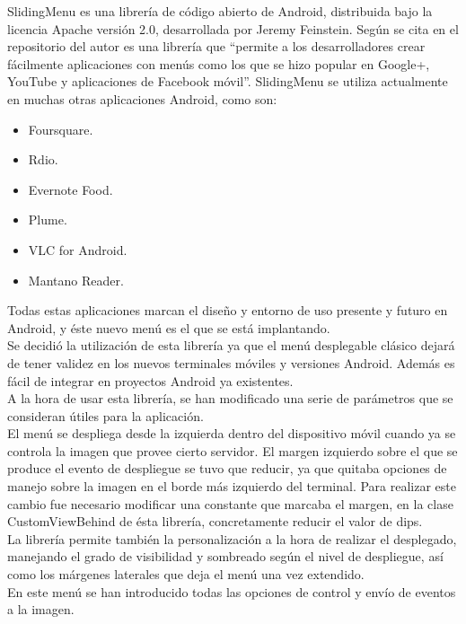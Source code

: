 SlidingMenu\cite{slide:slide} es una librería de código abierto de Android, distribuida bajo la licencia Apache versión 2.0, desarrollada por Jeremy Feinstein. Según se cita en el repositorio del autor es una librería que “permite a los desarrolladores crear fácilmente aplicaciones con menús como los que se hizo popular en Google+, YouTube y aplicaciones de Facebook móvil”.\cite{slide:slide}
SlidingMenu se utiliza actualmente en muchas otras aplicaciones Android, como son:
\begin{itemize}
\item Foursquare.
\item Rdio.
\item Evernote Food.
\item Plume.
\item VLC for Android.
\item Mantano Reader.
\end{itemize}

Todas estas aplicaciones marcan el diseño y entorno de uso presente y futuro en Android, y éste nuevo menú es el que se está implantando.\\

Se decidió la utilización de esta librería ya que el menú desplegable clásico dejará de tener validez en los nuevos terminales móviles y versiones Android. Además es fácil de integrar en proyectos Android ya existentes.\\

A la hora de usar esta librería, se han modificado una serie de parámetros que se consideran útiles para la aplicación.\\

El menú se despliega desde la izquierda dentro del dispositivo móvil cuando ya se controla la imagen que provee cierto servidor. El margen izquierdo sobre el que se produce el evento de despliegue se tuvo que reducir, ya que quitaba opciones de manejo sobre la imagen en el borde más izquierdo del terminal. Para realizar este cambio fue necesario modificar una constante que marcaba el margen, en la clase CustomViewBehind de ésta librería, concretamente reducir el valor de dips. \\

La librería permite también la personalización a la hora de realizar el desplegado, manejando el grado de visibilidad y sombreado según el nivel de despliegue, así como los márgenes laterales que deja el menú una vez extendido.\\

En este menú se han introducido todas las opciones de control y envío de eventos a la imagen.\\

